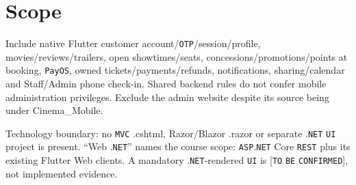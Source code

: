 \clearpage
\section{Scope}\label{sec:srs-3}
Include native Flutter customer account/\allowbreak{}\texttt{OTP}/\allowbreak{}session/\allowbreak{}profile, movies/\allowbreak{}reviews/\allowbreak{}trailers, open showtimes/\allowbreak{}seats, concessions/\allowbreak{}promotions/\allowbreak{}points at booking, \texttt{Pay\allowbreak{}OS}, owned tickets/\allowbreak{}payments/\allowbreak{}refunds, notifications, sharing/\allowbreak{}calendar and Staff/\allowbreak{}Admin phone check-in. Shared backend rules do not confer mobile administration privileges. Exclude the admin website despite its source being under Cinema\_Mobile.

Technology boundary: no \texttt{MVC} .cshtml, Razor/\allowbreak{}Blazor .razor or separate .\texttt{NET} \texttt{UI} project is present. “Web .\texttt{NET}” names the course scope: \texttt{ASP}.\texttt{NET} Core \texttt{REST} plus its existing Flutter Web clients. A mandatory .\texttt{NET}-rendered \texttt{UI} is [\texttt{TO} \texttt{BE} \texttt{CONFIRME\allowbreak{}D}], not implemented evidence.
